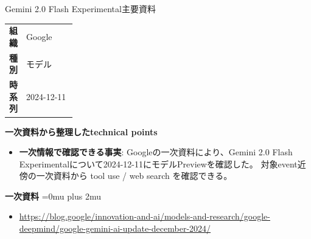 \begin{technicalnote}{Gemini 2.0 Flash Experimental}{主要資料}
\begingroup
\begin{tabularx}{\linewidth}{@{}>{\bfseries}p{0.22\linewidth}X@{}}
組織 & Google \\
種別 & モデル \\
時系列 & 2024-12-11 \\
\end{tabularx}
\smallskip
{\bfseries 一次資料から整理したtechnical points}
\begin{itemize}[leftmargin=1.5em,itemsep=0.35em]
\item \textbf{一次情報で確認できる事実}: Googleの一次資料により、Gemini 2.0 Flash Experimentalについて2024-12-11にモデルPreviewを確認した。 対象event近傍の一次資料から tool use / web search を確認できる。
\end{itemize}
\begin{minipage}{\linewidth}
\begin{samepage}
{\bfseries 一次資料}
\begingroup\sloppy
\Urlmuskip=0mu plus 2mu\relax
\begin{itemize}[leftmargin=1.5em,itemsep=0.25em]
\item {\scriptsize\url{https://blog.google/innovation-and-ai/models-and-research/google-deepmind/google-gemini-ai-update-december-2024/}}
\end{itemize}
\endgroup
\end{samepage}
\end{minipage}
\endgroup
\end{technicalnote}
\medskip

